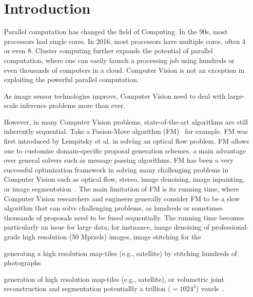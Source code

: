 \section{Introduction}
Parallel computation has changed the field of Computing.  In the 90s,
most processors had single cores. In 2016, most processors have multiple
cores, often 4 or even 8. Cluster computing further expands the
potential of parallel computation, where one can easily launch a
processing job using hundreds or even thousands of computers in a
cloud. Computer Vision is not an exception in exploiting the powerful
parallel computation.


As image sensor technologies improve, Computer Vision need to deal with
large-scale inference problems more than ever.

However, in many Computer Vision problems,
state-of-the-art algorithms are still inherently sequential. Take a
Fusion-Move algorithm (FM)~\cite{viktor,second_order_stereo,else} for
example. FM was first introduced by Lempitsky et al. in solving an
optical flow problem. FM allows one to customize domain-specific
proposal generation schemes, a main advantage over general solvers such
as message passing algorithms. FM has been a very successful
optimization framework in solving many challenging problems in Computer
Vision such as optical flow, stereo, image denoising, image inpainting,
or image
segmentation~\cite{fusion_moves_for_markov_random_field_optimization}. The
main limitation of FM is its running time, where Computer Vision
researchers and engineers generally consider FM to be a slow algorithm
that can solve challenging problems, as hundreds or sometimes thousands
of proposals need to be fused sequentially.
%
The running time becomes particularly an issue for large data, for
instnance, image denoising of professional-grade high resolution (50
Mpixels) images, image stitching for the

generating a high resolution map-tiles (e.g., satellite) by stitching
hundreds of photographs

generation of high resolution
map-tiles (e.g., satellite), or volumetric joint reconstruction and
segmentation potentiallly a trillion ($=1024^3$) voxels~\cite{Joint 3D
Scene Reconstruction and Class Segmentation}.

